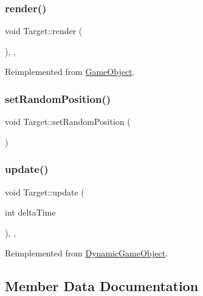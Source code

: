 \subsubsection{\texorpdfstring{render()}{render()}}
{\footnotesize\ttfamily void Target\+::render (\begin{DoxyParamCaption}{ }\end{DoxyParamCaption})\hspace{0.3cm}{\ttfamily [inline]}, {\ttfamily [final]}, {\ttfamily [virtual]}}



Reimplemented from \hyperlink{class_game_object_a484efb66a7a27c101e84c11d9905d7a6}{Game\+Object}.

\mbox{\label{class_target_a47eab7761cd91403698a23c65806cb28}} 
\subsubsection{\texorpdfstring{set\+Random\+Position()}{setRandomPosition()}}
{\footnotesize\ttfamily void Target\+::set\+Random\+Position (\begin{DoxyParamCaption}{ }\end{DoxyParamCaption})\hspace{0.3cm}{\ttfamily [inline]}}

\mbox{\label{class_target_a5f3b2dc70e8065e53199ab3244059ba7}} 
\subsubsection{\texorpdfstring{update()}{update()}}
{\footnotesize\ttfamily void Target\+::update (\begin{DoxyParamCaption}\item[{int}]{delta\+Time }\end{DoxyParamCaption})\hspace{0.3cm}{\ttfamily [inline]}, {\ttfamily [final]}, {\ttfamily [virtual]}}



Reimplemented from \hyperlink{class_dynamic_game_object_aaa505b57d131bbbce44d500ec2ca0e83}{Dynamic\+Game\+Object}.



\subsection{Member Data Documentation}
\mbox{\label{class_target_a55c8a14bee479115991505ae6dfff18a}} 
